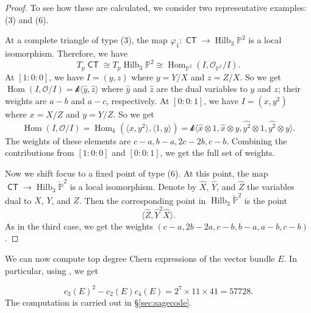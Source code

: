 \documentclass[reqno, 11pt]{amsart}
\theoremstyle{plain}
\theoremstyle{remark}
\renewcommand{\P}{\mathbb{P}}
\renewcommand{\k}{\mathscr{k}}
\DeclareMathOperator{\Hom}{Hom}
\DeclareMathOperator{\Hilb}{Hilb}
\renewcommand{\O}{\mathcal{O}}
\DeclareMathOperator{\CT}{\mathsf{CT}}
\begin{document}
\begin{proof}
To see how these are calculated, we consider two representative examples: (3) and (6).  

At a complete triangle of type (3), the
map $\varphi_{1}: \CT \to \Hilb_3 \P^2$ is a local isomorphism.
Therefore, we have
\[ T_p \CT \cong T_p \Hilb_3 \P^2 \cong \Hom_{\P^2} (I, \O_{\P^2}/I).\]
At $[1:0:0]$, we have $I = (y,z)$ where $y = Y/X$ and $z = Z/X$.  So
we get $\Hom(I, \O/I) = \k \langle \widehat y, \widehat z \rangle$
where $\widehat y$ and $\widehat z$ are the dual variables to $y$ and
$z$; their weights are $a-b$ and $a-c$, respectively.  At $[0:0:1]$,
we have $I = (x,y^2)$ where $x = X/Z$ and $y = Y/Z$.  So we get
\[\Hom(I, \O/I) = \Hom_k (\langle x, y^2 \rangle, \langle 1, y \rangle) = \k \langle \widehat x \otimes 1, \widehat x \otimes y, \widehat{y^2} \otimes 1, \widehat{y^2} \otimes y \rangle.\]
The weights of these elements are $c-a, b-a, 2c-2b, c-b$.  Combining
the contributions from $[1:0:0]$ and $[0:0:1]$, we get the full set of
weights.


Now we shift focus to a fixed point of type (6).  At this point,
the map $\CT \to \Hilb_3 \check{\P}^2$ is a local isomorphism.  Denote
by $\widehat{X}$, $\widehat{Y}$, and $\widehat{Z}$ the variables dual
to $X$, $Y$, and $Z$.  Then the corresponding point in
$\Hilb_3 \check{\P}^2$ is the point
\[ \langle \widehat{Z}, \widehat{Y}^2\widehat{X} \rangle.\] As in the
third case, we get the weights $(c-a, 2b-2a, c-b, b-a, a-b, c-b)$.

\end{proof}

We can now compute top degree Chern expressions of the vector bundle $E$. In particular, using , we get

\begin{equation}
  \label{eq:57728}
c_3(E)^2 - c_2(E)c_4(E) = 2^7 \times 11 \times 41 = 57728.
\end{equation}
The computation is carried out in \S \ref{sec:sagecode}.
\end{document}
